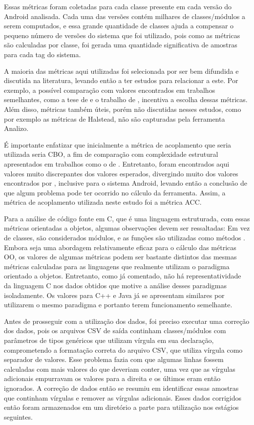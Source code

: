 Essas métricas foram coletadas para cada classe presente em cada versão do Android analisada. Cada uma das versões contém milhares de classes/módulos a serem computados, e essa grande quantidade de classes ajuda a compensar o pequeno número de versões do sistema que foi utilizado, pois como as métricas são calculadas por classe, foi gerada uma quantidade significativa de amostras para cada tag do sistema.

A maioria das métricas aqui utilizadas foi selecionada por ser bem difundida e discutida na literatura, levando então a ter estudos para relacionar a este. Por exemplo, a possível comparação com valores encontrados em trabalhos semelhantes, como a tese de  e o trabalho de , incentiva a escolha dessas métricas. Além disso, métricas também úteis, porém não discutidas nesses estudos, como por exemplo as métricas de Halstead, não são capturadas pela ferramenta Analizo.

É importante enfatizar que inicialmente a métrica de acoplamento que seria utilizada seria CBO, a fim de comparação com complexidade estrutural apresentados em trabalhos como o de . Entretanto, foram encontrados aqui valores muito discrepantes dos valores esperados, divergindo muito dos valores encontrados por , inclusive para o sistema Android, levando então a conclusão de que algum problema pode ter ocorrido no cálculo da ferramenta. Assim, a métrica de acoplamento utilizada neste estudo foi a métrica ACC.

Para a análise de código fonte em C, que é uma linguagem estruturada, com essas métricas orientadas a objetos, algumas observações devem ser ressaltadas: Em vez de classes, são considerados módulos, e as funções são utilizadas como métodos \cite{terceiro2009}. Embora seja uma abordagem relativamente eficaz para o cálculo das métricas OO, os valores de algumas métricas podem ser bastante distintos das mesmas métricas calculadas para as linguagens que realmente utilizam o paradigma orientado a objetos. Entretanto, como já comentado, não há representatividade da linguagem C nos dados obtidos que motive a análise desses paradigmas isoladamente. Os valores para C++ e Java já se apresentam similares por utilizarem o mesmo paradigma e portanto terem funcionamento semelhante.

Antes de prosseguir com a utilização dos dados, foi preciso executar uma correção dos dados, pois os arquivos CSV de saída continham classes/módulos com parâmetros de tipos genéricos que utilizam vírgula em sua declaração, comprometendo a formatação correta do arquivo CSV, que utiliza vírgula como separador de valores. Esse problema fazia com que algumas linhas fossem calculadas com mais valores do que deveriam conter, uma vez que as vírgulas adicionais empurravam os valores para a direita e os últimos eram então ignorados. A correção de dados então se resumiu em identificar essas amostras que continham vírgulas e remover as vírgulas adicionais. Esses dados corrigidos então foram armazenados em um diretório a parte para utilização nos estágios seguintes.

